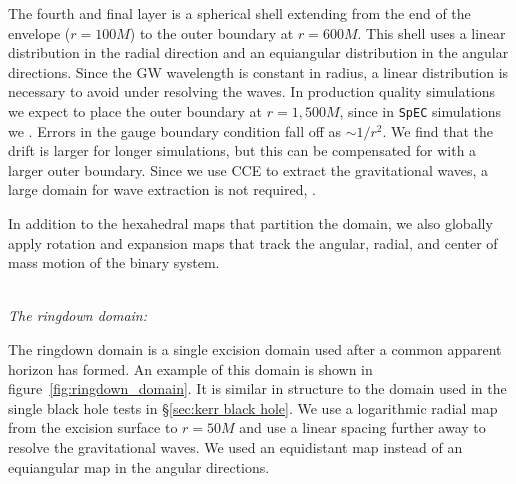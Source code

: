 \begin{bibunit}[unsrtnat]
The fourth and final layer is a spherical shell extending from the end of the
envelope ($r=100M$) to the outer boundary at $r=600M$. This shell uses a linear
distribution in the radial direction and an equiangular distribution in the
angular directions. Since the GW wavelength is constant in radius, a linear
distribution is necessary to avoid under resolving the waves. In production
quality simulations we expect to place the outer boundary at $r=1,500M$, since
in  \texttt{SpEC} simulations we . Errors in the gauge boundary condition fall off as $\sim1/r^2$. We
find that the drift is larger for longer simulations, but this can be
compensated for with a larger outer boundary. Since we use CCE to extract the
gravitational waves, a large domain for wave extraction is not required,
.

In addition to the hexahedral maps that partition the domain, we also globally
apply rotation and expansion maps that track the angular, radial,
and center of mass motion of the binary system.

\\

\noindent\textit{The ringdown domain:}

The ringdown domain is a single excision domain used after a common apparent
horizon has formed. An example of this domain is shown in
figure~\ref{fig:ringdown_domain}. It is similar in structure to the domain used
in the single black hole tests in \S\ref{sec:kerr black hole}. We use a
logarithmic radial map from the excision surface to $r=50M$ and use a linear
spacing further away to resolve the gravitational waves. We used an equidistant
map instead of an equiangular map in the angular directions.


\end{bibunit}

